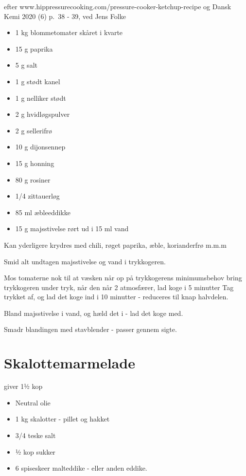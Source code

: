 \documentclass[
  letterpaper,
  DIV=11,
  numbers=noendperiod]{scrreprt}
\providecommand{\tightlist}{%
  \setlength{\itemsep}{0pt}\setlength{\parskip}{0pt}}\usepackage{longtable,booktabs,array}
\begin{document}
efter www.hippressurecooking.com/pressure-cooker-ketchup-recipe og Dansk
Kemi 2020 (6) p.~38 - 39, ved Jens Folke

\begin{itemize}
\tightlist
\item
  1 kg blommetomater skåret i kvarte
\item
  15 g paprika
\item
  5 g salt
\item
  1 g stødt kanel
\item
  1 g nelliker stødt
\item
  2 g hvidløgspulver
\item
  2 g sellerifrø
\item
  10 g dijonsennep
\item
  15 g honning
\item
  80 g rosiner
\item
  1/4 zittauerløg
\item
  85 ml æbleeddikke
\item
  15 g majsstivelse rørt ud i 15 ml vand
\end{itemize}

Kan yderligere krydres med chili, røget paprika, æble, korianderfrø
m.m.m

Smid alt undtagen majsstivelse og vand i trykkogeren.

Mos tomaterne nok til at væsken når op på trykkogerens minimumsbehov
bring trykkogeren under tryk, når den når 2 atmosfærer, lad koge i 5
minutter Tag trykket af, og lad det koge ind i 10 minutter - reduceres
til knap halvdelen.

Bland majsstivelse i vand, og hæld det i - lad det koge med.

Smadr blandingen med stavblender - passer gennem sigte.

\hypertarget{skalottemarmelade}{%
\section{Skalottemarmelade}\label{skalottemarmelade}}

giver 1½ kop

\begin{itemize}
\tightlist
\item
  Neutral olie
\item
  1 kg skalotter - pillet og hakket
\item
  3/4 teske salt
\item
  ½ kop sukker
\item
  6 spiseskeer malteddike - eller anden eddike.
\end{itemize}
\end{document}
